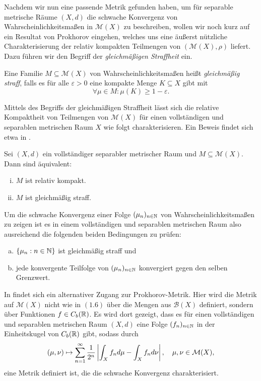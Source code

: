 Nachdem wir nun eine passende Metrik gefunden haben, um für separable metrische Räume $(X,d)$ die schwache Konvergenz von Wahrscheinlichkeitsmaßen in $\mathcal{M}(X)$ zu beschreiben, wollen wir noch kurz auf ein Resultat von Prokhorov eingehen, 
welches uns eine äußerst nützliche Charakterisierung der relativ kompakten Teilmengen von $(\mathcal{M}(X), \rho)$ liefert. 
Dazu führen wir den Begriff der \textit{gleichmäßigen Straffheit} ein.
\begin{mydef}
    Eine Familie $M \subseteq \mathcal{M}(X)$ von Wahrscheinlichkeitsmaßen heißt \textit{gleichmäßig straff}, 
    falls es für alle $\varepsilon > 0$ eine kompakte Menge $K \subseteq X$ gibt mit 
    $$
        \forall \mu \in M: \mu(K) \geq 1-\varepsilon. 
    $$
\end{mydef}

Mittels des Begriffs der gleichmäßigen Straffheit lässt sich die relative Kompaktheit von Teilmengen von $\mathcal{M}(X)$ für einen vollständigen und separablen metrischen Raum $X$ wie folgt charakterisieren. Ein Beweis findet sich etwa in \cite[Theorem II.6.7]{parthasarathy}. 

\begin{theorem}
    Sei $(X,d)$ ein vollständiger separabler metrischer Raum und $M \subseteq \mathcal{M}(X)$. Dann sind äquivalent:
    \begin{enumerate}[(i)]
        \item $M$ ist relativ kompakt.
        \item $M$ ist gleichmäßig straff. 
    \end{enumerate}
\end{theorem}

Um die schwache Konvergenz einer Folge $(\mu_n)_{n \in \mathbb{N}}$ von Wahrscheinlichkeitsmaßen zu zeigen ist es in einem vollständigen und separablen metrischen Raum also ausreichend die folgenden beiden Bedingungen zu prüfen:
\begin{enumerate}[(a)]
    \item $\{\mu_n: n \in \mathbb{N}\}$ ist gleichmäßig straff und
    \item jede konvergente Teilfolge von $(\mu_n)_{n \in \mathbb{N}}$ konvergiert gegen den selben Grenzwert.
\end{enumerate}

\begin{remark}
    In \cite{li-queffelec} findet sich ein alternativer Zugang zur Prokhorov-Metrik. Hier wird die Metrik auf $\mathcal{M}(X)$ nicht wie in $(1.6)$ über die Mengen aus $\mathcal{B}(X)$ definiert, sondern über Funktionen $f \in C_b(\mathbb{R})$.
    Es wird dort gezeigt, dass es für einen vollständigen und separablen metrischen Raum $(X,d)$ eine Folge $(f_n)_{n \in \mathbb{N}}$ in der Einheitskugel von $C_b(\mathbb{R})$ gibt, sodass durch
    $$
        (\mu, \nu) \mapsto \sum_{n=1}^{\infty}\frac{1}{2^n}\left| \int_Xf_nd\mu - \int_X f_n d\nu \right|, \quad \mu, \nu \in \mathcal{M}(X),
    $$
    eine Metrik definiert ist, die die schwache Konvergenz charakterisiert. 
\end{remark}
